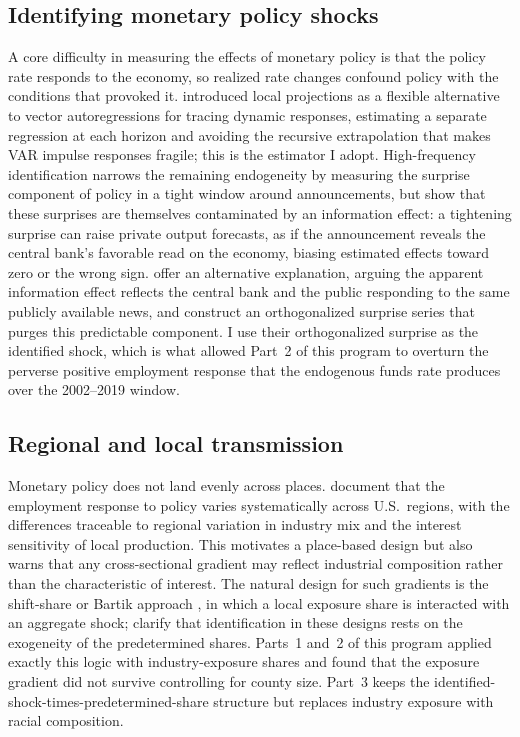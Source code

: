 \documentclass[11pt]{article}
\begin{document}
\subsection{Identifying monetary policy shocks}
A core difficulty in measuring the effects of monetary policy is that the policy rate
responds to the economy, so realized rate changes confound policy with the conditions that
provoked it. \citet{Jorda2005} introduced local projections as a flexible alternative to
vector autoregressions for tracing dynamic responses, estimating a separate regression at
each horizon and avoiding the recursive extrapolation that makes VAR impulse responses
fragile; this is the estimator I adopt. High-frequency identification narrows the
remaining endogeneity by measuring the surprise component of policy in a tight window
around announcements, but \citet{NakamuraSteinsson2018} show that these surprises are
themselves contaminated by an information effect: a tightening surprise can raise private
output forecasts, as if the announcement reveals the central bank's favorable read on the
economy, biasing estimated effects toward zero or the wrong sign. \citet{BauerSwanson2023}
offer an alternative explanation, arguing the apparent information effect reflects the
central bank and the public responding to the same publicly available news, and construct
an orthogonalized surprise series that purges this predictable component. I use their
orthogonalized surprise as the identified shock, which is what allowed Part~2 of this
program to overturn the perverse positive employment response that the endogenous funds
rate produces over the 2002--2019 window.

\subsection{Regional and local transmission}
Monetary policy does not land evenly across places. \citet{CarlinoDeFina1998} document
that the employment response to policy varies systematically across U.S.\ regions, with
the differences traceable to regional variation in industry mix and the interest
sensitivity of local production. This motivates a place-based design but also warns that
any cross-sectional gradient may reflect industrial composition rather than the
characteristic of interest. The natural design for such gradients is the shift-share or
Bartik approach \citep{Bartik1991}, in which a local exposure share is interacted with an
aggregate shock; \citet{GPSS2020} clarify that identification in these designs rests on the
exogeneity of the predetermined shares. Parts~1 and~2 of this program applied exactly this
logic with industry-exposure shares and found that the exposure gradient did not survive
controlling for county size. Part~3 keeps the identified-shock-times-predetermined-share
structure but replaces industry exposure with racial composition.
\end{document}
